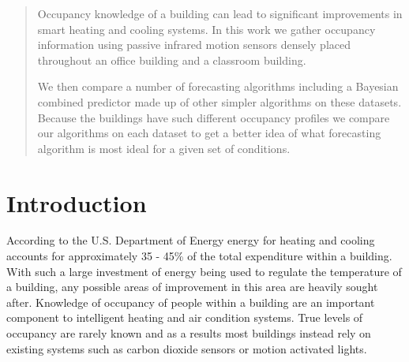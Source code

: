 \documentclass{acm_proc_article-sp}
\begin{document}
\date{17 May 2013}


\maketitle
\begin{abstract}
Occupancy knowledge of a building can lead to significant improvements in smart heating and cooling systems.  In this work we gather occupancy information using passive infrared motion sensors densely placed throughout an office building and a classroom building.  

We then compare a number of forecasting algorithms including a Bayesian combined predictor made up of other simpler algorithms on these datasets.  Because the buildings have such different occupancy profiles we compare our algorithms on each dataset to get a better idea of what forecasting algorithm is most ideal for a given set of conditions.  
\end{abstract}




\section{Introduction}

According to the U.S. Department of Energy energy for heating and cooling accounts for approximately 35 - 45\% \cite{DOE2010} of the total expenditure within a building. With such a large investment of energy being used to regulate the temperature of a building, any possible areas of improvement in this area are heavily sought after.   Knowledge of occupancy of people within a building are an important component to intelligent heating and air condition systems.  True levels of occupancy are rarely known and as a results most buildings instead rely on existing systems such as carbon dioxide sensors or motion activated lights.  
\end{document}
